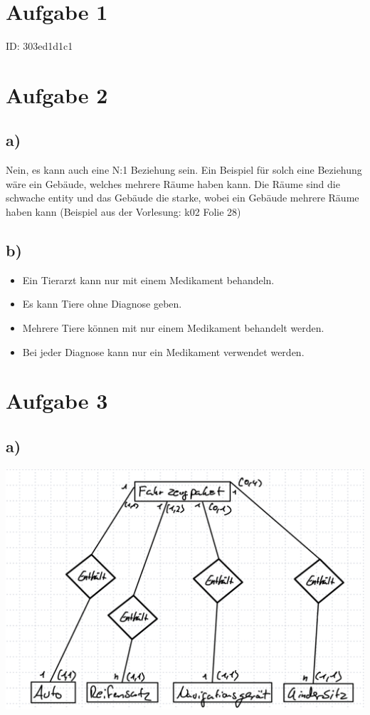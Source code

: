 \documentclass[12pt,german,a4paper]{article}
\title{#1}
\author{Mike Lenz, Jonas Tesfamariam}
\begin{document}
\maketitle	

\section*{Aufgabe 1}
ID: 303ed1d1c1
\section*{Aufgabe 2}
\subsection*{a)}
Nein, es kann auch eine N:1 Beziehung sein. Ein Beispiel für solch eine Beziehung wäre ein Gebäude, welches mehrere Räume haben kann. Die Räume sind die schwache entity und das Gebäude die starke, wobei ein Gebäude mehrere Räume haben kann (Beispiel aus der Vorlesung: k02 Folie 28)
\subsection*{b)}
\begin{itemize}
\item Ein Tierarzt kann nur mit einem Medikament behandeln.
\item Es kann Tiere ohne Diagnose geben.
\item Mehrere Tiere können mit nur einem Medikament behandelt werden.
\item Bei jeder Diagnose kann nur ein Medikament verwendet werden.
\end{itemize}
\section*{Aufgabe 3}
\subsection*{a)}
\includegraphics[width=\linewidth]{./img/aufgabe3a.png}
\end{document}

